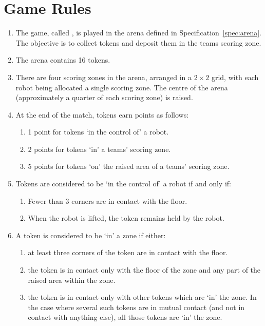 \section{Game Rules}
\label{sec:rules}

\begin{enumerate}
  \item The game, called \emph{\gamename}, is played in the arena defined in
        Specification~\ref{spec:arena}. The objective is to collect tokens and
        deposit them in the teams scoring zone.
  \item The arena contains 16 tokens.
  \item There are four scoring zones in the arena, arranged in a $2\times2$
        grid, with each robot being allocated a single scoring zone. The centre
        of the arena (approximately a quarter of each scoring zone) is raised.
  \item At the end of the match, tokens earn points as follows:
    \begin{enumerate}
      \item 1 point for tokens `in the control of' a robot.
      \item 2 points for tokens `in' a teams' scoring zone.
      \item 5 points for tokens `on' the raised area of a teams' scoring zone.
    \end{enumerate}
  \item Tokens are considered to be `in the control of' a robot if and only if:
    \begin{enumerate}
      \item Fewer than 3 corners are in contact with the floor.
      \item When the robot is lifted, the token remains held by the robot.
    \end{enumerate}
  \item A token is considered to be `in' a zone if either:
    \begin{enumerate}
      \item at least three corners of the token are in contact with the floor.
      \item the token is in contact only with the floor of the zone and any part
            of the raised area within the zone.
      \item the token is in contact only with other tokens which are `in' the zone.
            In the case where several such tokens are in mutual contact (and not in
            contact with anything else), all those tokens are `in' the zone.

\end{enumerate}
\end{enumerate}
